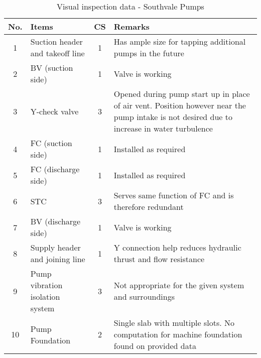 \begin{table}[!htb]
	\caption{Visual inspection data - Southvale Pumps}
	\label{ch043_tbl_visualinspectionASV}
		{\scriptsize
\begin{tabular}{c|l|c|p{9.5cm}}

\hline
No. & Items & CS & Remarks \\ 
\hline
1 & Suction header and takeoff line & 1 & Has ample size for tapping additional pumps in the future \\ 
2 & BV (suction side) & 1 & Valve is working \\ 
3 & Y-check valve & 3 & Opened during pump start up in place of air vent. Position however near the pump intake is not desired due to increase in water turbulence \\ 
4 & FC (suction side) & 1 & Installed as required \\ 
5 & FC (discharge side) & 1 & Installed as required \\ 
6 & STC & 3 & Serves same function of FC and is therefore redundant \\ 
7 & BV (discharge side) & 1 & Valve is working \\ 
8 & Supply header and joining line & 1 & Y connection help reduces hydraulic thrust and flow resistance \\ 
9 & Pump vibration isolation system & 3 & Not appropriate for the given system and surroundings \\ 
10 & Pump Foundation & 2 & Single slab with multiple slots. No computation for machine foundation found on provided data \\ 
\hline


\end{tabular}
	}
\end{table}